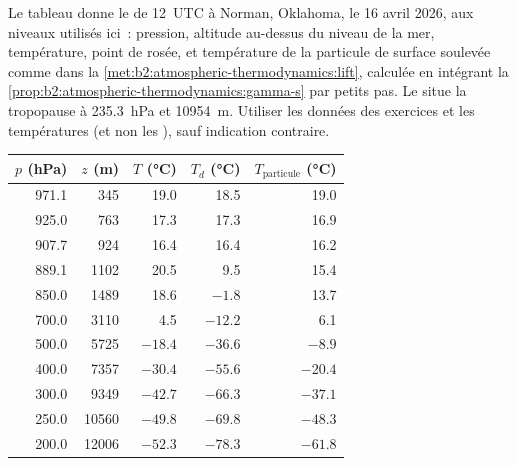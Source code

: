 \begin{problem}\label{pb:b2:atmospheric-thermodynamics:1}
Le tableau donne le  de 12~UTC à Norman, Oklahoma, le 16 avril 2026, aux niveaux utilisés
ici~: pression, altitude au-dessus du niveau de la mer, température, point de rosée, et
température de la particule de surface soulevée comme dans la \cref{met:b2:atmospheric-thermodynamics:lift},
calculée en intégrant la \cref{prop:b2:atmospheric-thermodynamics:gamma-s} par petits pas.
Le  situe la tropopause à \qty{235.3}{hPa} et \qty{10954}{m}. Utiliser les données
des exercices et les températures (et non les ), sauf indication contraire.

\begin{center}
\small
\begin{tabular}{rrrrr}
\hline
$p$ (\unit{hPa}) & $z$ (\unit{m}) & $T$ (\unit{\celsius}) & $T_d$ (\unit{\celsius}) &
$T_{\text{particule}}$ (\unit{\celsius}) \\
\hline
971.1 & 345 & 19.0 & 18.5 & 19.0 \\
925.0 & 763 & 17.3 & 17.3 & 16.9 \\
907.7 & 924 & 16.4 & 16.4 & 16.2 \\
889.1 & 1102 & 20.5 & 9.5 & 15.4 \\
850.0 & 1489 & 18.6 & $-1.8$ & 13.7 \\
700.0 & 3110 & 4.5 & $-12.2$ & 6.1 \\
500.0 & 5725 & $-18.4$ & $-36.6$ & $-8.9$ \\
400.0 & 7357 & $-30.4$ & $-55.6$ & $-20.4$ \\
300.0 & 9349 & $-42.7$ & $-66.3$ & $-37.1$ \\
250.0 & 10560 & $-49.8$ & $-69.8$ & $-48.3$ \\
200.0 & 12006 & $-52.3$ & $-78.3$ & $-61.8$ \\
\hline
\end{tabular}
\end{center}


\end{problem}

